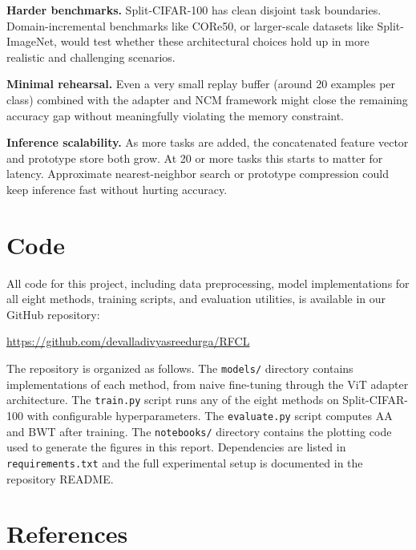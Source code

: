 \documentclass{article}
\begin{document}
\textbf{Harder benchmarks.} Split-CIFAR-100 has clean disjoint task boundaries.
Domain-incremental benchmarks like CORe50, or larger-scale datasets like
Split-ImageNet, would test whether these architectural choices hold up in more
realistic and challenging scenarios.

\textbf{Minimal rehearsal.} Even a very small replay buffer (around 20 examples
per class) combined with the adapter and NCM framework might close the remaining
accuracy gap without meaningfully violating the memory constraint.

\textbf{Inference scalability.} As more tasks are added, the concatenated
feature vector and prototype store both grow. At 20 or more tasks this starts
to matter for latency. Approximate nearest-neighbor search or prototype
compression could keep inference fast without hurting accuracy.

\section{Code}
\label{sec:code}

All code for this project, including data preprocessing, model implementations
for all eight methods, training scripts, and evaluation utilities, is available
in our GitHub repository:

\begin{center}
  \url{https://github.com/devalladivyasreedurga/RFCL}
\end{center}

The repository is organized as follows. The \texttt{models/} directory contains
implementations of each method, from naive fine-tuning through the ViT adapter
architecture. The \texttt{train.py} script runs any of the eight methods on
Split-CIFAR-100 with configurable hyperparameters. The \texttt{evaluate.py}
script computes AA and BWT after training. The \texttt{notebooks/} directory
contains the plotting code used to generate the figures in this report.
Dependencies are listed in \texttt{requirements.txt} and the full experimental
setup is documented in the repository README.

\section*{References}
\end{document}
